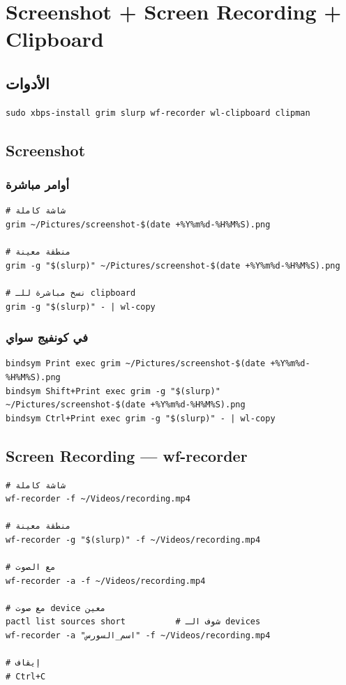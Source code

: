 \documentclass[12pt, a4paper]{report}
\begin{document}
\chapter{Screenshot + Screen Recording + Clipboard}

\section{الأدوات}
\begin{lstlisting}
sudo xbps-install grim slurp wf-recorder wl-clipboard clipman
\end{lstlisting}

\section{Screenshot}

\subsection{أوامر مباشرة}
\begin{lstlisting}
# شاشة كاملة
grim ~/Pictures/screenshot-$(date +%Y%m%d-%H%M%S).png

# منطقة معينة
grim -g "$(slurp)" ~/Pictures/screenshot-$(date +%Y%m%d-%H%M%S).png

# نسخ مباشرة للـ clipboard
grim -g "$(slurp)" - | wl-copy
\end{lstlisting}

\subsection{في كونفيج سواي}
\begin{lstlisting}
bindsym Print exec grim ~/Pictures/screenshot-$(date +%Y%m%d-%H%M%S).png
bindsym Shift+Print exec grim -g "$(slurp)" ~/Pictures/screenshot-$(date +%Y%m%d-%H%M%S).png
bindsym Ctrl+Print exec grim -g "$(slurp)" - | wl-copy
\end{lstlisting}

\section{Screen Recording — wf-recorder}
\begin{lstlisting}
# شاشة كاملة
wf-recorder -f ~/Videos/recording.mp4

# منطقة معينة
wf-recorder -g "$(slurp)" -f ~/Videos/recording.mp4

# مع الصوت
wf-recorder -a -f ~/Videos/recording.mp4

# مع صوت device معين
pactl list sources short          # شوف الـ devices
wf-recorder -a "اسم_السورس" -f ~/Videos/recording.mp4

# إيقاف
# Ctrl+C
\end{lstlisting}
\end{document}
